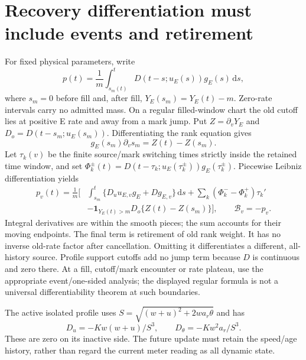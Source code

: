 \documentclass[11pt,a4paper]{article}
\newcommand{\dd}{\,\mathrm d}
\newcommand{\Bud}{\mathcal B}
\begin{document}
\section{Recovery differentiation must include events and retirement}
For fixed physical parameters, write
\begin{equation}
 p(t)=\frac1m\int_{s_m(t)}^t
 D(t-s;u_E(s))g_E(s)\dd s,
 \label{eq:recoverytime}
\end{equation}
where $s_m=0$ before fill and, after fill,
$Y_E(s_m)=Y_E(t)-m$. Zero-rate intervals carry no admitted mass. On a
regular filled-window chart the old cutoff lies at positive E rate and
away from a mark jump. Put $Z=\partial_vY_E$ and
$D_o=D(t-s_m;u_E(s_m))$. Differentiating the rank equation gives
\begin{equation}
 g_E(s_m)\partial_vs_m=Z(t)-Z(s_m).
 \label{eq:cutoffderivative}
\end{equation}
Let $\tau_k(v)$ be the finite source/mark switching times strictly inside
the retained time window, and set
$\Phi_k^\pm(t)=D(t-\tau_k;u_E(\tau_k^\pm))g_E(\tau_k^\pm)$.
Piecewise Leibniz differentiation yields
\begin{align}
 p_v(t)=\frac1m\bigg[&\int_{s_m}^t
       \{D_u u_{E,v}g_E+Dg_{E,v}\}\dd s
       +\sum_k(\Phi_k^- -\Phi_k^+)\tau_k'\nonumber\\
       &-\mathbf1_{Y_E(t)>m}D_o\{Z(t)-Z(s_m)\}\bigg],
 \qquad \Bud_v=-p_v.
 \label{eq:recoveryderivative}
\end{align}
Integral derivatives are within the smooth pieces; the sum accounts for
their moving endpoints. The final term is retirement of old rank weight.
It has no inverse old-rate factor after cancellation. Omitting it
differentiates a different, all-history source. Profile support cutoffs
add no jump term because $D$ is continuous and zero there. At a fill,
cutoff/mark encounter or rate plateau, use the appropriate event/one-sided
analysis; the displayed regular formula is not a universal differentiability
theorem at such boundaries.

The active isolated profile uses
$S=\sqrt{(w+u)^2+2wa_r\theta}$ and has
\begin{equation}
 D_u=-Kw(w+u)/S^3,\qquad D_\theta=-Kw^2a_r/S^3.
 \label{eq:kernelderivative}
\end{equation}
These are zero on its inactive side. The future update must retain the
speed/age history, rather than regard the current meter reading as all
dynamic state.
\end{document}
